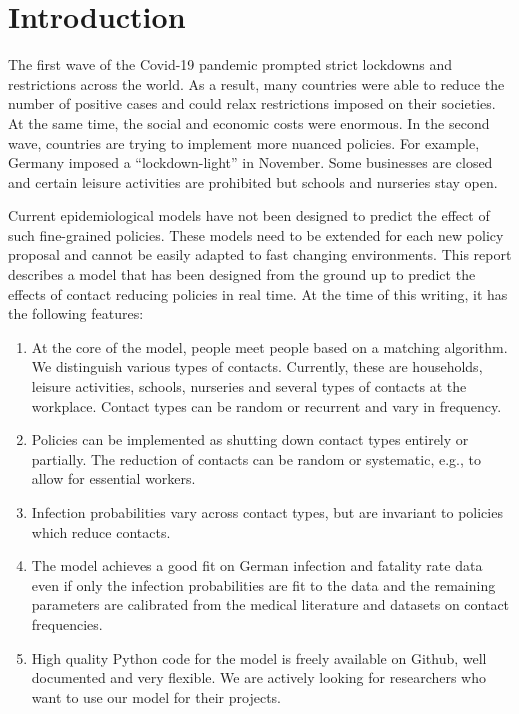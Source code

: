 \section{Introduction}
\label{sec:introduction}

The first wave of the Covid-19 pandemic prompted strict lockdowns and restrictions
across the world. As a result, many countries were able to reduce the number of positive
cases and could relax restrictions imposed on their societies. At the same time, the
social and economic costs were enormous. In the second wave, countries are trying to
implement more nuanced policies. For example, Germany imposed a ``lockdown-light'' in
November. Some businesses are closed and certain leisure activities are prohibited but
schools and nurseries stay open.

Current epidemiological models have not been designed to predict the effect of such
fine-grained policies. These models need to be extended for each new policy proposal and
cannot be easily adapted to fast changing environments. This report describes a model
that has been designed from the ground up to predict the effects of contact reducing
policies in real time. At the time of this writing, it has the following features:

\begin{enumerate}
    \item At the core of the model, people meet people based on a matching algorithm. We
          distinguish various types of contacts. Currently, these are households,
          leisure activities, schools, nurseries and several types of contacts at the
          workplace. Contact types can be random or recurrent and vary in frequency.

    \item Policies can be implemented as shutting down contact types entirely or
          partially. The reduction of contacts can be random or systematic, e.g., to
          allow for essential workers.

    \item Infection probabilities vary across contact types, but are invariant to
          policies which reduce contacts.

    \item The model achieves a good fit on German infection and fatality rate data even
          if only the infection probabilities are fit to the data and the remaining
          parameters are calibrated from the medical literature and datasets on contact
          frequencies.

    \item High quality Python code for the model is freely available on Github, well
          documented and very flexible\footnotemark. We are actively looking for
          researchers who want to use our model for their projects.
\end{enumerate}

